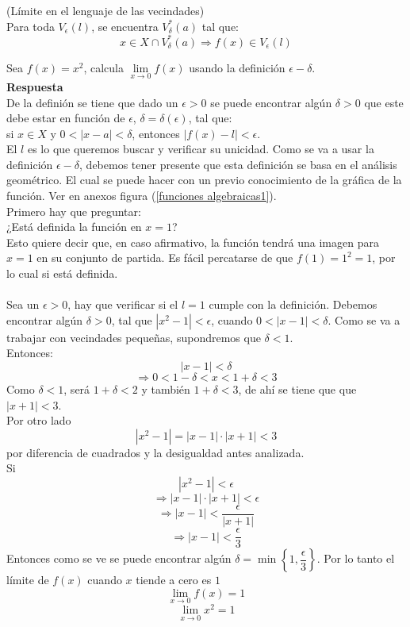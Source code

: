 \documentclass[10pt,twoside]{SelfArx} %
\begin{document}
\begin{thm}
	(Límite en el lenguaje de las vecindades)\\
	Para toda $ V_{\epsilon}(l) $, se encuentra $ V_{\delta}^{*}(a) $ tal que:\\
	\[ x\in X\cap V_{\delta}^{*}(a)\Rightarrow f(x)\in V_{\epsilon}(l) \]
	
	
\end{thm}

\begin{ejemplo}
	Sea $ f(x)=x^{2} $, calcula $ \lim\limits_{x\rightarrow0}f(x) $ usando la definición $ \epsilon-\delta $.\\
	\textbf{Respuesta}\\
	De la definión se tiene que dado un $ \epsilon>0 $ se puede encontrar alg\'un $ \delta>0 $ que este debe estar en funci\'on de $ \epsilon $, $ \delta=\delta(\epsilon) $, tal que:\\
	si	$ x\in X $ y $ 0<|x-a|<\delta $, entonces $ |f(x)-l|<\epsilon $.\\
	El $ l $ es lo que queremos buscar y verificar su unicidad. Como se va a usar la definici\'on $ \epsilon-\delta $, debemos tener presente que esta definici\'on se basa en el análisis geométrico. El cual se puede hacer con un previo conocimiento de la gráfica de la función. Ver en anexos figura (\ref{funciones algebraicas1}).\\
	Primero hay que preguntar:\\
	¿Está definida la función en $ x=1 $?\\
	Esto quiere decir que, en caso afirmativo, la función tendrá una imagen para $ x=1 $ en su conjunto de partida. Es fácil percatarse de que $ f(1)=1^{2}=1 $, por lo cual si está definida.\\
	
	\\
	Sea un $ \epsilon>0 $, hay que verificar si el $ l=1 $ cumple con la definici\'on. Debemos encontrar alg\'un $ \delta>0 $, tal que $ |x^{2}-1|<\epsilon $, cuando $ 0<|x-1|<\delta $. Como se va a trabajar con vecindades pequeñas, supondremos que $ \delta<1 $.\\
	\newpage
	Entonces:\\
	\[ |x-1|<\delta \]
	\[ \Rightarrow0<1-\delta<x<1+\delta<3 \]
	Como $ \delta<1 $, será $ 1+\delta<2 $ y también $ 1+\delta<3 $, de ahí se tiene que que $  |x+1|<3 $.\\
	Por otro lado 
	\[ |x^{2}-1|=|x-1|\cdot|x+1|<3 \]
	por diferencia de cuadrados y la desigualdad antes analizada.\\
	Si 
	\[ |x^{2}-1|<\epsilon \]
	\[ \Rightarrow|x-1|\cdot|x+1|<\epsilon \]
	\[ \Rightarrow|x-1|<\dfrac{\epsilon}{|x+1|} \]
	\[ \Rightarrow|x-1|<\dfrac{\epsilon}{3} \]
	Entonces como se ve se puede encontrar algún $ \delta=\min\left \{1,\dfrac{\epsilon}{3}\right \} $.
	Por lo tanto el límite de $ f(x) $ cuando $ x $ tiende a cero es $ 1 $
	\[ \lim\limits_{x\rightarrow0}f(x)=1 \]
	\[ \lim\limits_{x\rightarrow0}x^{2}=1 \]	
\end{ejemplo}
\end{document}
